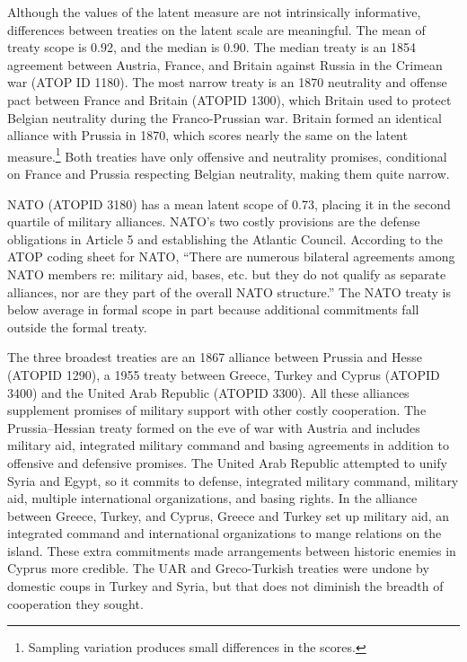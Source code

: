 \documentclass[12pt]{article}
\begin{document}
Although the values of the latent measure are not intrinsically informative, differences between treaties on the latent scale are meaningful. 
The mean of treaty scope is 0.92, and the median is 0.90. 
The median treaty is an 1854 agreement between Austria, France, and Britain against Russia in the Crimean war (ATOP ID 1180). 
The most narrow treaty is an 1870 neutrality and offense pact between France and Britain (ATOPID 1300), which Britain used to protect Belgian neutrality during the Franco-Prussian war.  
Britain formed an identical alliance with Prussia in 1870, which scores nearly the same on the latent measure.\footnote{
Sampling variation produces small differences in the scores.} 
Both treaties have only offensive and neutrality promises, conditional on France and Prussia respecting Belgian neutrality, making them quite narrow. 


NATO (ATOPID 3180) has a mean latent scope of 0.73, placing it in the second quartile of military alliances. 
NATO's two costly provisions are the defense obligations in Article 5 and establishing the Atlantic Council. 
According to the ATOP coding sheet for NATO, ``There are numerous bilateral agreements among NATO members re: military aid, bases, etc. but they do not qualify as separate alliances, nor are they part of the overall NATO structure.''
The NATO treaty is below average in formal scope in part because additional commitments fall outside the formal treaty.    


The three broadest treaties are an 1867 alliance between Prussia and Hesse (ATOPID 1290), a 1955 treaty between Greece, Turkey and Cyprus (ATOPID 3400) and the United Arab Republic (ATOPID 3300).  
All these alliances supplement promises of military support with other costly cooperation. 
The Prussia--Hessian treaty formed on the eve of war with Austria and includes military aid, integrated military command and basing agreements in addition to offensive and defensive promises. 
The United Arab Republic attempted to unify Syria and Egypt, so it commits to defense, integrated military command, military aid, multiple international organizations, and basing rights. 
In the alliance between Greece, Turkey, and Cyprus, Greece and Turkey set up military aid, an integrated command and international organizations to mange relations on the island.
These extra commitments made arrangements between historic enemies in Cyprus more credible. 
The UAR and Greco-Turkish treaties were undone by domestic coups in Turkey and Syria, but that does not diminish the breadth of cooperation they sought. 
\end{document}
